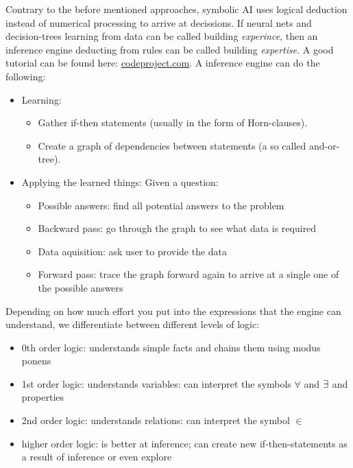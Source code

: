 Contrary to the before mentioned approaches, symbolic AI uses logical deduction instead of numerical processing to arrive at decissions. If neural nets and decision-trees learning from data can be called building \emph{experince}, then an inference engine deducting from rules can be called building \emph{expertise}. A good tutorial can be found here: \href{codeproject.com/Articles/179375/Man-Marriage-and-Machine-Adventures-in-Artificia}{codeproject.com}.
A inference engine can do the following: 
\begin{itemize}
	\item Learning: 
		\begin{itemize}
			\item Gather if-then statements (usually in the form of Horn-clauses).
			\item Create a graph of dependencies between statements (a so called and-or-tree).
		\end{itemize}
	\item Applying the learned things: Given a question: 
		\begin{itemize}
			\item Possible answers: find all potential answers to the problem
			\item Backward pass: go through the graph to see what data is required
			\item Data aquisition: ask user to provide the data
			\item Forward pass: trace the graph forward again to arrive at a single one of the possible answers
		\end{itemize}
\end{itemize}

Depending on how much effort you put into the expressions that the engine can understand, we differentiate between different levels of logic: 
\begin{itemize}
    \item 0th order logic: understands simple facts and chains them using modus ponens
    \item 1st order logic: understands variables: can interpret the symbols $\forall$ and $\exists$ and properties
    \item 2nd order logic: understands relations: can interpret the symbol $\in$ 
    \item higher order logic: is better at inference; can create new if-then-statements as a result of inference or even explore
\end{itemize}


